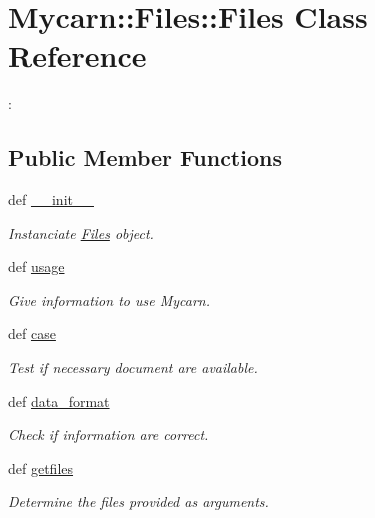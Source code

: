 \hypertarget{classMycarn_1_1Files_1_1Files}{
\section{\-Mycarn\-:\-:\-Files\-:\-:\-Files \-Class \-Reference}
\label{classMycarn_1_1Files_1_1Files}
}


\-:  


\subsection*{\-Public \-Member \-Functions}
\begin{DoxyCompactItemize}
\item 
\hypertarget{classMycarn_1_1Files_1_1Files_a0d8c92797632d315d9affb06f8db223c}{
def \hyperlink{classMycarn_1_1Files_1_1Files_a0d8c92797632d315d9affb06f8db223c}{\-\_\-\-\_\-init\-\_\-\-\_\-}}
\label{classMycarn_1_1Files_1_1Files_a0d8c92797632d315d9affb06f8db223c}

\begin{DoxyCompactList}\small\item\em \-Instanciate \hyperlink{classMycarn_1_1Files_1_1Files}{\-Files} object. \end{DoxyCompactList}\item 
def \hyperlink{classMycarn_1_1Files_1_1Files_ac2c8c7a4f8345a8b1b233b636a3e5373}{usage}
\begin{DoxyCompactList}\small\item\em \-Give information to use \-Mycarn. \end{DoxyCompactList}\item 
def \hyperlink{classMycarn_1_1Files_1_1Files_af3e0c76338a508a3e7b1b1300dd8ab72}{case}
\begin{DoxyCompactList}\small\item\em \-Test if necessary document are available. \end{DoxyCompactList}\item 
\hypertarget{classMycarn_1_1Files_1_1Files_a859dde4e2afabe42187fac54cc8df90e}{
def \hyperlink{classMycarn_1_1Files_1_1Files_a859dde4e2afabe42187fac54cc8df90e}{data\-\_\-format}}
\label{classMycarn_1_1Files_1_1Files_a859dde4e2afabe42187fac54cc8df90e}

\begin{DoxyCompactList}\small\item\em \-Check if information are correct. \end{DoxyCompactList}\item 
def \hyperlink{classMycarn_1_1Files_1_1Files_ab817de39c55ef95a79960c499ee283cf}{getfiles}
\begin{DoxyCompactList}\small\item\em \-Determine the files provided as arguments. \end{DoxyCompactList}\end{DoxyCompactItemize}
